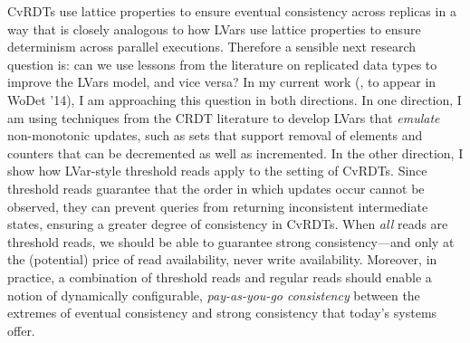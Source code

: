 \documentclass{article}
\begin{document}
CvRDTs use lattice properties to ensure eventual consistency across
replicas in a way that is closely analogous to how LVars use lattice
properties to ensure determinism across parallel executions.
Therefore a sensible next research question is: can we use lessons
from the literature on replicated data types to improve the LVars
model, and vice versa?  In my current work (\cite{joining-wodet}, to
appear in WoDet '14), I am approaching this question in both
directions.  In one direction, I am using techniques from the CRDT
literature to develop LVars that \emph{emulate} non-monotonic updates,
such as sets that support removal of elements and counters that can be
decremented as well as incremented.  In the other direction, I show
how LVar-style threshold reads apply to the setting of CvRDTs.  Since
threshold reads guarantee that the order in which updates occur cannot
be observed, they can prevent queries from returning inconsistent
intermediate states, ensuring a greater degree of consistency in
CvRDTs.  When \emph{all} reads are threshold reads, we should be able
to guarantee strong consistency---and only at the (potential) price of
read availability, never write availability. Moreover, in practice, a
combination of threshold reads and regular reads should enable a
notion of dynamically configurable, \emph{pay-as-you-go consistency}
between the extremes of eventual consistency and strong consistency
that today's systems offer.


\newcommand{\myname}[0]{\textbf{Lindsey Kuper}}

\end{document}
